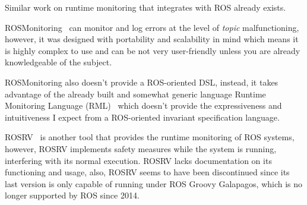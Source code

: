 Similar work on runtime monitoring that integrates with ROS already exists. 

ROSMonitoring~\cite{ferrando2020rosmonitoring} can monitor and log errors at the level of \textit{topic} malfunctioning, however, it was designed with portability and scalability in mind which means it is highly complex to use and can be not very user-friendly unless you are already knowledgeable of the subject. 

ROSMonitoring also doesn't provide a ROS-oriented DSL, instead, it takes advantage of the already built and somewhat generic language Runtime Monitoring Language (RML)~\cite{rml} which doesn't provide the expressiveness and intuitiveness I expect from a ROS-oriented invariant specification language. 

ROSRV~\cite{huang2014rosrv} is another tool that provides the runtime monitoring of ROS systems, however, ROSRV implements safety measures while the system is running, interfering with its normal execution. ROSRV lacks documentation on its functioning and usage, also, ROSRV seems to have been discontinued since its last version is only capable of running under ROS Groovy Galapagos, which is no longer supported by ROS since 2014.
